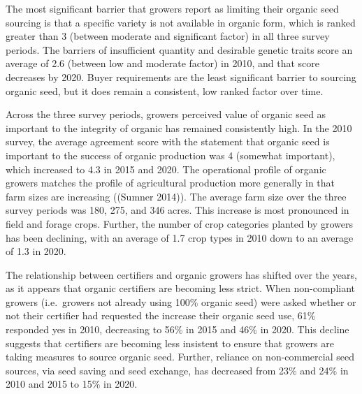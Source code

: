 \documentclass[twoside,12pt,final]{ucthesis-CA2012}
\begin{document}
\begin{ucmainmatter}
The most significant barrier that growers report as limiting their
organic seed sourcing is that a specific variety is not available in
organic form, which is ranked greater than 3 (between moderate and
significant factor) in all three survey periods. The barriers of
insufficient quantity and desirable genetic traits score an average of
2.6 (between low and moderate factor) in 2010, and that score decreases
by 2020. Buyer requirements are the least significant barrier to
sourcing organic seed, but it does remain a consistent, low ranked
factor over time.

Across the three survey periods, growers\textquotesingle{} perceived value of organic
seed as important to the integrity of organic has remained consistently
high. In the 2010 survey, the average agreement score with the statement
that organic seed is important to the success of organic production was
4 (somewhat important), which increased to 4.3 in 2015 and 2020. The
operational profile of organic growers matches the profile of
agricultural production more generally in that farm sizes are increasing
((Sumner 2014)). The
average farm size over the three survey periods was 180, 275, and 346
acres. This increase is most pronounced in field and forage crops.
Further, the number of crop categories planted by growers has been
declining, with an average of 1.7 crop types in 2010 down to an average
of 1.3 in 2020.

The relationship between certifiers and organic growers has shifted over
the years, as it appears that organic certifiers are becoming less
strict. When non-compliant growers (i.e.~growers not already using 100\%
organic seed) were asked whether or not their certifier had requested
the increase their organic seed use, 61\% responded yes in 2010,
decreasing to 56\% in 2015 and 46\% in 2020. This decline suggests that
certifiers are becoming less insistent to ensure that growers are taking
measures to source organic seed. Further, reliance on non-commercial
seed sources, via seed saving and seed exchange, has decreased from 23\%
and 24\% in 2010 and 2015 to 15\% in 2020.
\begin{table}


\end{table}
\end{ucmainmatter}
\end{document}
